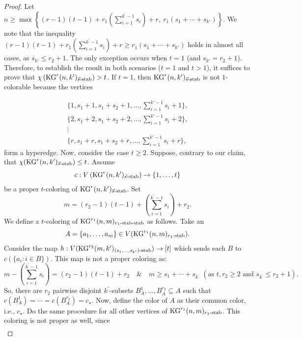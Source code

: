 \documentclass[preprint,12pt,3p]{elsarticle}
\begin{document}
\begin{proof}
Let \(n \geq \max\left\{(r-1)(t-1) + r_1\left(\sum_{i=1}^{k^{\prime}-1}s_i\right) + r,\ r_1(s_1 + \cdots + s_{k'})\right\}\). We note that the inequality \((r-1)(t-1) + r_1\left(\sum_{i=1}^{k^{\prime}-1}s_i\right) + r \geq r_1(s_1 + \cdots + s_{k'})\) holds in almost all cases, as \(s_{k'} \leq r_2 + 1\). The only exception occurs when \(t=1\) (and \(s_{k'}=r_2+1\)). Therefore, to establish the result in both scenarios (\(t=1\) and \(t>1\)), it suffices to prove that \(\chi \left(\mathrm{KG}^{r}(n,k^{\prime})_{\vec{s}\textup{-stab}}\right) > t\). If $t = 1$, then $\mathrm{KG}^{r}(n,k')_{\vec{s}\textup{-stab}}$ is not $1$-colorable because the vertices 

\[
\begin{array}{c}
\{1, s_1+1, s_1+s_2+1, \ldots, \textstyle\sum_{i=1}^{k'-1}s_i+1\}, \\
\{2, s_1+2, s_1+s_2+2, \ldots, \textstyle\sum_{i=1}^{k'-1}s_i+2\}, \\
\vdots \\
\{r, s_1+r, s_1+s_2+r, \ldots, \textstyle\sum_{i=1}^{k'-1}s_i+r\},
\end{array}
\]
form a hyperedge. Now, consider the case $t \geq 2$. Suppose, contrary to our claim, that $\chi (\mathrm{KG}^{r}(n,k^{\prime})_{\vec{s}\textup{-stab}})\leq t$. Assume
\[
c : V\left(\mathrm{KG}^{r}(n,k^{\prime})_{\vec{s}\textup{-stab}}\right)\to\{1,\ldots, t\}
\]
be a proper $t$-coloring of $\mathrm{KG}^{r}(n,k^{\prime})_{\vec{s}\textup{-stab}}$. Set 
\[
m= (r_2-1)(t-1)+ \left(\sum_{i=1}^{k^{\prime}-1}s_i\right) + r_2.
\]
We define a $t$-coloring of $\mathrm{KG}^{r_1}(n,m)_{r_1\textup{-stab}\textup{-stab}}$ as follows. Take an 
\[
A=\{a_1,\ldots, a_m\}\in V(\mathrm{KG}^{r_1}(n,m)_{r_1\textup{-stab}}).
\] 
Consider the map $h: V(\mathrm{KG}^{r_2}(m,k^{\prime})_{(s_1,\ldots, s_{k^{\prime}})\textup{-stab}})\to [t]$ which sends each $B$ to $c(\{a_i : i\in B\})$. This map is not a proper coloring as:
\[
m-\left(\sum_{i=1}^{k^{\prime}-1}s_i\right)= (r_2-1)(t-1) + r_2 \quad \& \quad m\geq s_1+\cdots +s_{k^{\prime}}\,\, (\text{as} \,\,t, r_2\geq 2\,\, \text{and}\,\, s_{k^{\prime}}\leq r_2+1 ).
\]
So, there are $r_2$ pairwise disjoint $k^{\prime}$-subsets $B_A^1, \ldots, B_A^{r_2}\subseteq A$ such that $c(B_A^1)=\cdots =c(B_A^{r_2})= c_{\star}$. Now, define the color of $A$ as their common color, i.e., $c_{\star}$. Do the same procedure for all other vertices of $\mathrm{KG}^{r_1}(n,m)_{r_1\textup{-stab}}$. This coloring is not proper as well, since
\begin{align*}

\end{align*}
\end{proof}
\end{document}
